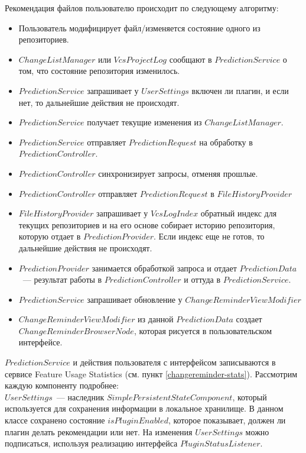Рекомендация файлов пользователю происходит по следующему алгоритму:
    \begin{itemize}
        \item Пользователь модифицирует файл/изменяется состояние одного из репозиториев.
        \item $ChangeListManager$ или $VcsProjectLog$ сообщают в $PredictionService$ о том, что состояние репозитория изменилось.
        \item $PredictionService$ запрашивает у $UserSettings$ включен ли плагин, и если нет, то дальнейшие действия не происходят.
        \item $PredictionService$ получает текущие изменения из $ChangeListManager$.
        \item $PredictionService$ отправляет $PredictionRequest$ на обработку в $PredictionController$.
        \item $PredictionController$ синхронизирует запросы, отменяя прошлые. 
        \item $PredictionController$ отправляет $PredictionRequest$ в $FileHistoryProvider$
        \item $FileHistoryProvider$ запрашивает у $VcsLogIndex$ обратный индекс для текущих репозиториев и на его основе собирает историю репозитория, которую отдает в $PredictionProvider$. Если индекс еще не готов, то дальнейшие действия не происходят.
        \item $PredictionProvider$ занимается обработкой запроса и отдает $PredictionData$~--- результат работы в $PredictionController$ и оттуда в $PredictionService$.
        \item $PredictionService$ запрашивает обновление у $ChangeReminderViewModifier$
        \item $ChangeReminderViewModifier$ из данной $PredictionData$ создает $ChangeReminderBrowserNode$, которая рисуется в пользовательском интерфейсе.
    \end{itemize}
    
    
$PredictionService$ и действия пользователя с интерфейсом записываются в сервисе Feature Usage Statistics (см. пункт \ref{changereminder-stats}). Рассмотрим каждую компоненту подробнее:\\


$UserSettings$~--- наследник $SimplePersistentStateComponent$, который используется для сохранения информации в локальное хранилище. В данном классе сохранено состояние $isPluginEnabled$, которое показывает, должен ли плагин делать рекомендации или нет. На изменения $UserSettings$ можно подписаться, используя реализацию интерфейса $PluginStatusListener$.\\


